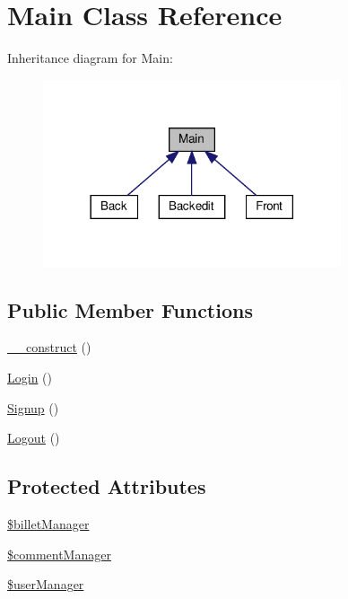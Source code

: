 \hypertarget{class_src_1_1_controllers_1_1_main}{}\section{Main Class Reference}
\label{class_src_1_1_controllers_1_1_main}


Inheritance diagram for Main\+:
\nopagebreak
\begin{figure}[H]
\begin{center}
\leavevmode
\includegraphics[width=249pt]{class_src_1_1_controllers_1_1_main__inherit__graph}
\end{center}
\end{figure}
\subsection*{Public Member Functions}
\begin{DoxyCompactItemize}
\item 
\hyperlink{class_src_1_1_controllers_1_1_main_a095c5d389db211932136b53f25f39685}{\+\_\+\+\_\+construct} ()
\item 
\hyperlink{class_src_1_1_controllers_1_1_main_a8db48c2902872da0ee80463db6696375}{Login} ()
\item 
\hyperlink{class_src_1_1_controllers_1_1_main_aba348654bb87049dfb96fa24794b191b}{Signup} ()
\item 
\hyperlink{class_src_1_1_controllers_1_1_main_aa14f760d541a59acb41ac8eefddafb9b}{Logout} ()
\end{DoxyCompactItemize}
\subsection*{Protected Attributes}
\begin{DoxyCompactItemize}
\item 
\hyperlink{class_src_1_1_controllers_1_1_main_a7205c4d22c61e375f2be552a32f97ccb}{\$billet\+Manager}
\item 
\hyperlink{class_src_1_1_controllers_1_1_main_a2fdbb2dc79956746757958a453709ca6}{\$comment\+Manager}
\item 
\hyperlink{class_src_1_1_controllers_1_1_main_afd45ca85c50f41c20a03f0a8d0f4db23}{\$user\+Manager}
\end{DoxyCompactItemize}


